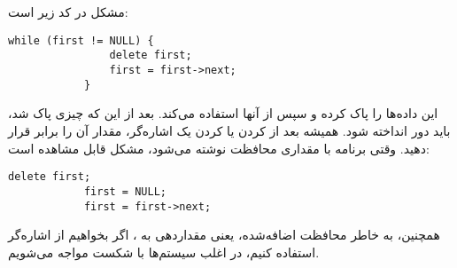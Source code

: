 \section{}
\paragraph{}\label{answer:77}
مشکل در کد زیر است:
\begin{LTR}
        \begin{lstlisting}[style=C++Style]
            while (first != NULL) {
                delete first;
                first = first->next;
            }
        \end{lstlisting}
\end{LTR}

این داده‌ها را پاک کرده و سپس از آنها استفاده می‌کند. بعد از این که چیزی پاک شد، باید دور انداخته شود. همیشه بعد از  کردن یا  کردن یک اشاره‌گر، مقدار آن را برابر  قرار دهید. وقتی برنامه با مقداری محافظت نوشته می‌شود، مشکل قابل مشاهده است:
\begin{LTR}
        \begin{lstlisting}[style=C++Style]
            delete first;
            first = NULL;
            first = first->next;
        \end{lstlisting}
\end{LTR}

همچنین، به خاطر محافظت اضافه‌شده، یعنی مقدار‌دهی  به ، اگر بخواهیم از اشاره‌گر استفاده کنیم، در اغلب سیستم‌ها با شکست مواجه می‌شویم.
